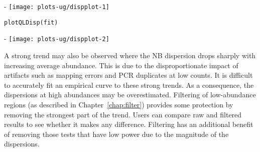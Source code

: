 \documentclass{report}\usepackage[]{graphicx}\usepackage[usenames,dvipsnames]{color}
\makeatletter
\def\maxwidth{ %
  \ifdim\Gin@nat@width>\linewidth
    \linewidth
  \else
    \Gin@nat@width
  \fi
}
\newcommand{\hlnum}[1]{\textcolor[rgb]{0.816,0.125,0.439}{#1}}%
\newcommand{\hlstr}[1]{\textcolor[rgb]{0.251,0.627,0.251}{#1}}%
\newcommand{\hlopt}[1]{\textcolor[rgb]{0,0,0}{#1}}%
\newcommand{\hlstd}[1]{\textcolor[rgb]{0.251,0.251,0.251}{#1}}%
\newcommand{\hlkwb}[1]{\textcolor[rgb]{0,0,0}{#1}}%
\newcommand{\hlkwc}[1]{\textcolor[rgb]{0.251,0.251,0.251}{#1}}%
\newcommand{\hlkwd}[1]{\textcolor[rgb]{0.878,0.439,0.125}{#1}}%
\newenvironment{knitrout}{}{} %
\makeatother
\begin{document}
\begin{knitrout}
\color{fgcolor}\begin{adjustwidth}{0mm}{-\fltoffset}
\texttt{[image: plots-ug/dispplot-1]} \end{adjustwidth}\begin{kframe}\begin{alltt}
\hlkwd{plotQLDisp}\hlstd{(fit)}
\end{alltt}
\end{kframe}\begin{adjustwidth}{0mm}{-\fltoffset}
\texttt{[image: plots-ug/dispplot-2]} \end{adjustwidth}
\end{knitrout}

A strong trend may also be observed where the NB dispersion drops sharply with increasing average abundance.
This is due to the disproportionate impact of artifacts such as mapping errors and PCR duplicates at low counts. 
It is difficult to accurately fit an empirical curve to these strong trends.  
As a consequence, the dispersions at high abundances may be overestimated. 
Filtering of low-abundance regions (as described in Chapter~\ref{chap:filter}) provides some protection by removing the strongest part of the trend.
Users can compare raw and filtered results to see whether it makes any difference.
Filtering has an additional benefit of removing those tests that have low power due to the magnitude of the dispersions.
\end{document}
